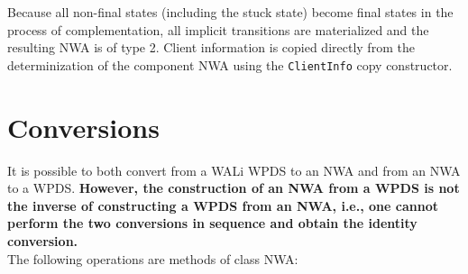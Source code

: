 \documentclass{llncs}
\begin{document}
Because all non-final states (including the stuck state) become final states
in the process of complementation, all implicit transitions are materialized
and the resulting NWA is of type 2.  Client information is copied directly
from the determinization of the component NWA using the \texttt{ClientInfo}
copy constructor.

\section{Conversions}
\label{Se:Conversions}


It is possible to both convert from a WALi WPDS to an NWA and from an NWA to
a WPDS.  \textbf{However, the construction of an NWA from a WPDS is not the
  inverse of constructing a WPDS from an NWA, i.e., one cannot perform the
  two conversions in sequence and obtain the identity conversion.} \\

\noindent The following operations are methods of class NWA:
\end{document}
